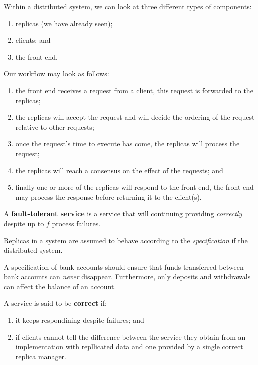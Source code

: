 Within a distributed system, we can look at three different types of components:
\begin{enumerate}
    \item replicas (we have already seen);
    \item clients; and
    \item the front end.
\end{enumerate}
Our workflow may look as follows:
\begin{enumerate}
    \item the front end receives a request from a client,
        this request is forwarded to the replicas;
    \item the replicas will accept the request
        and will decide the ordering of the request relative to other requests;
    \item once the request's time to execute has come,
        the replicas will process the request;
    \item the replicas will reach a consensus on the effect of the requests; and
    \item finally one or more of the replicas will respond to the front end,
        the front end may process the response before returning it to the client(s).
\end{enumerate}

\begin{definition}
    A \textbf{fault-tolerant service} is a service that will continuing providing
    \emph{correctly} despite up to $f$ process failures.
\end{definition}

Replicas in a system are assumed to behave according to the \emph{specification}
if the distributed system.

\begin{example}
    A specification of bank accounts should ensure that funds
    transferred between bank accounts can \emph{never} disappear.
    Furthermore, only deposits and withdrawals can affect the balance
    of an account.
\end{example}

A service is said to be \textbf{correct} if:
\begin{enumerate}
    \item it keeps respondining despite failures; and
    \item if clients cannot tell the difference between the service
        they obtain from an implementation with repllicated data 
        and one provided by a single correct replica manager.
\end{enumerate}

